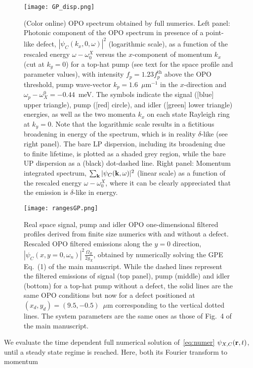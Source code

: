 %
\begin{figure}[h!]
\texttt{[image: GP\_disp.png]}
\caption{(Color online) OPO spectrum obtained by full numerics. Left
  panel: Photonic component of the OPO spectrum in presence of a
  point-like defect, $|\psi_C(k_x,0,\omega)|^2$ (logarithmic scale),
  as a function of the rescaled energy $\omega - \omega_0^X$ versus
  the $x$-component of momentum $k_x$ (cut at $k_y=0$) for a top-hat
  pump (see text for the space profile and parameter values), with
  intensity $f_p=1.23 f_p^{\text{th}}$ above the OPO threshold, pump
  wave-vector $k_p=1.6$~$\mu$m$^{-1}$ in the $x$-direction and
  $\omega_p-\omega_X^0=-0.44$~meV. The symbols indicate the signal
  ([blue] upper triangle), pump ([red] circle), and idler ([green]
  lower triangle) energies, as well as the two momenta $k_x$ on each
  state Rayleigh ring at $k_y=0$. Note that the logarithmic scale
  results in a fictitious broadening in energy of the spectrum, which
  is in reality $\delta$-like (see right panel). The bare LP
  dispersion, including its broadening due to finite lifetime, is
  plotted as a shaded grey region, while the bare UP dispersion as a
  (black) dot-dashed line. Right panel: Momentum integrated spectrum,
  $\sum_{{\mathbf k}} |\psi_C({\mathbf k},\omega)|^2$ (linear scale) as a
  function of the rescaled energy $\omega - \omega_0^X$, where it can
  be clearly appreciated that the emission is $\delta$-like in
  energy.}
\label{fig:spectGP}
\end{figure}
%
\begin{figure}[h!]
\texttt{[image: rangesGP.png]}
\caption{Real space signal, pump and idler OPO one-dimensional
  filtered profiles derived from finite size numerics with and without
  a defect. Rescaled OPO filtered emissions along the $y=0$ direction,
  $|\psi_C(x,y=0,\omega_n)|^2 \frac{\Omega_R}{2g_X}$, obtained by
  numerically solving the GPE Eq.~(1) of the main manuscript. While
  the dashed lines represent the filtered emissions of signal (top
  panel), pump (middle) and idler (bottom) for a top-hat pump without
  a defect, the solid lines are the same OPO conditions but now for a
  defect positioned at $(x_d, y_d) = (9.5, -0.5)$~$\mu$m corresponding
  to the vertical dotted lines. The system parameters are the same
  ones as those of Fig.~4 of the main manuscript.}
\label{fig:rafull}
\end{figure}
%
We evaluate the time dependent full numerical solution
of~\eqref{eq:numer} $\psi_{X,C} ({\mathbf r},t)$, until a steady state
regime is reached. Here, both its Fourier transform to momentum
